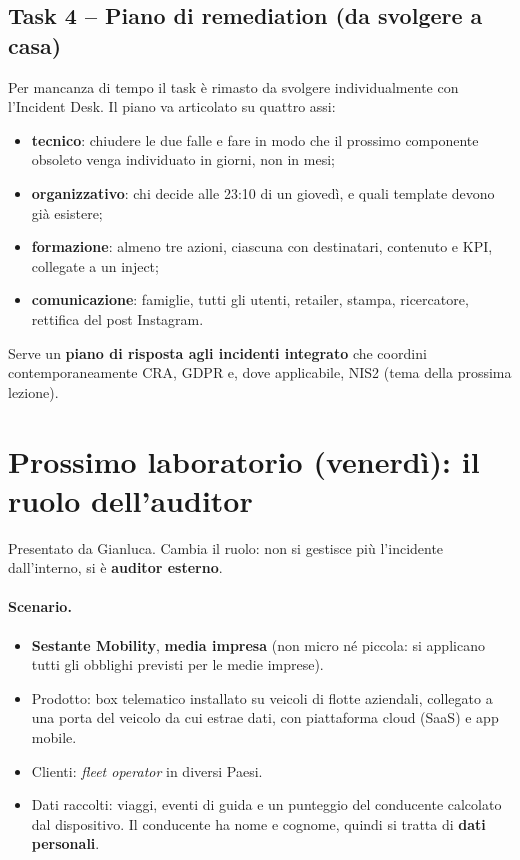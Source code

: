 \subsection{Task 4 -- Piano di remediation (da svolgere a casa)}

Per mancanza di tempo il task è rimasto da svolgere individualmente con l'Incident Desk.
Il piano va articolato su quattro assi:
\begin{itemize}
  \item \textbf{tecnico}: chiudere le due falle e fare in modo che il prossimo componente obsoleto
    venga individuato in giorni, non in mesi;
  \item \textbf{organizzativo}: chi decide alle 23:10 di un giovedì, e quali template devono già esistere;
  \item \textbf{formazione}: almeno tre azioni, ciascuna con destinatari, contenuto e KPI, collegate a
    un inject;
  \item \textbf{comunicazione}: famiglie, tutti gli utenti, retailer, stampa, ricercatore, rettifica
    del post Instagram.
\end{itemize}

\begin{esame}
Serve un \textbf{piano di risposta agli incidenti integrato} che coordini contemporaneamente CRA,
GDPR e, dove applicabile, NIS2 (tema della prossima lezione).
\end{esame}

\section{Prossimo laboratorio (venerdì): il ruolo dell'auditor}

Presentato da Gianluca. Cambia il ruolo: non si gestisce più l'incidente dall'interno, si è
\textbf{auditor esterno}.

\paragraph{Scenario.}
\begin{itemize}
  \item \textbf{Sestante Mobility}, \textbf{media impresa} (non micro né piccola: si applicano tutti
    gli obblighi previsti per le medie imprese).
  \item Prodotto: box telematico installato su veicoli di flotte aziendali, collegato a una porta del
    veicolo da cui estrae dati, con piattaforma cloud (SaaS) e app mobile.
  \item Clienti: \emph{fleet operator} in diversi Paesi.
  \item Dati raccolti: viaggi, eventi di guida e un punteggio del conducente calcolato dal dispositivo.
    Il conducente ha nome e cognome, quindi si tratta di \textbf{dati personali}.
\end{itemize}

